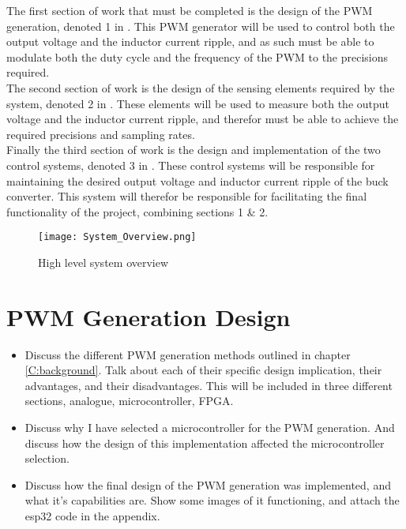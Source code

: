 The first section of work that must be completed is the design of the PWM generation, denoted 1 in . This PWM generator will be used to control both the output voltage and the inductor current ripple, and as such must be able to modulate both the duty cycle and the frequency of the PWM to the precisions required. \\

The second section of work is the design of the sensing elements required by the system, denoted 2 in . These elements will be used to measure both the output voltage and the inductor current ripple, and therefor must be able to achieve the required precisions and sampling rates. \\

Finally the third section of work is the design and implementation of the two control systems, denoted 3 in . These control systems will be responsible for maintaining the desired output voltage and inductor current ripple of the buck converter. This system will therefor be responsible for facilitating the final functionality of the project, combining sections 1 \& 2. \\

    
\begin{figure}[!h]
    \texttt{[image: System\_Overview.png]}
    \caption{High level system overview}
    \label{F:sys_overview}
\end{figure}

\section{PWM Generation Design}\label{S:pwm_gen}

\begin{itemize}

    \item 
    Discuss the different PWM generation methods outlined in chapter \ref{C:background}. Talk about each of their specific design implication, their advantages, and their disadvantages. This will be included in three different sections, analogue, microcontroller, FPGA. 

    \item 
    Discuss why I have selected a microcontroller for the PWM generation. And discuss how the design of this implementation affected the microcontroller selection. 

    \item 
    Discuss how the final design of the PWM generation was implemented, and what it's capabilities are. Show some images of it functioning, and attach the esp32 code in the appendix.

\end{itemize}